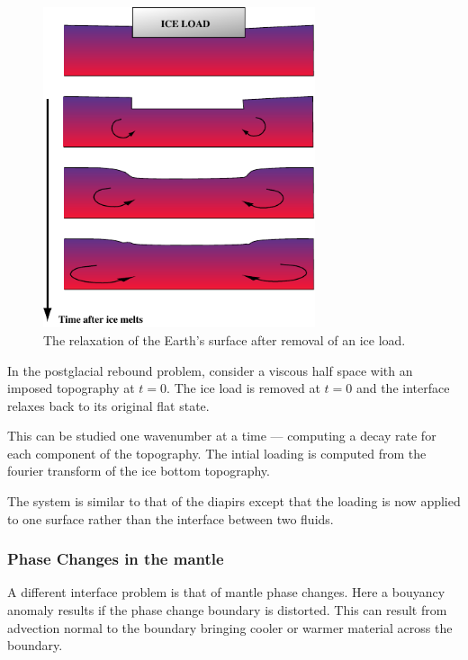 \documentclass[10pt]{article}
\begin{document}
		\begin{figure}[h]
			\begin{center}
				\includegraphics[width=80mm]{Diagrams/postglac}
				\caption[]{The relaxation of the Earth's surface
				after removal of an ice load.
				}
				\label{fig:postg1}
			\end{center}	
		\end{figure}
	
	In the postglacial rebound problem, consider a viscous half
	space with an imposed topography at $t=0$. The ice load
	is removed at $t=0$ and the interface relaxes back to 
	its original flat state. 
	
	This can be studied one wavenumber at a time --- computing a
	decay rate for each component of the topography. The intial
	loading is computed from the fourier transform of the 
	ice bottom topography.
	
	The system is similar to that of the diapirs except that the 
	loading is now applied to one surface rather than
	the interface between two fluids.
		
	\subsubsection{Phase Changes in the mantle}
	
	A different interface problem is that of mantle phase changes. 
	Here a bouyancy anomaly results if the phase change boundary is
	distorted. This can result from advection normal
	to the boundary bringing cooler or warmer material across
	the boundary.
	
\end{document}
